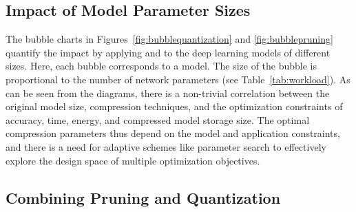\subsection{Impact of Model Parameter Sizes}
The bubble charts in Figures~\ref{fig:bubblequantization} and \ref{fig:bubblepruning} quantify the impact by applying \quantization and
\pruning to the deep learning models of different sizes. Here, each bubble corresponds to a model. The size of the bubble is proportional
to the number of network parameters (see Table~\ref{tab:workload}). As can be seen from the diagrams, there is a non-trivial correlation
between the original model size, compression techniques, and the optimization constraints of accuracy, time, energy, and compressed model
storage size. The optimal compression parameters thus depend on the model and application constraints, and there is a need for adaptive
schemes like parameter search to effectively explore the design space of multiple optimization objectives.






\subsection{Combining Pruning and Quantization\label{sec:combin}}



